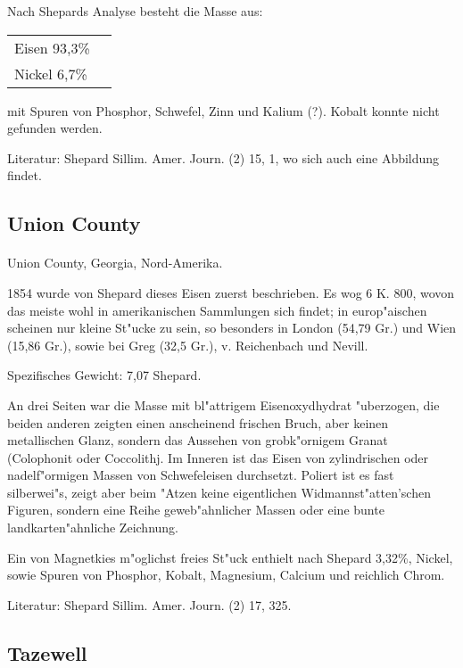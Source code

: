 \documentclass[a4paper, 11pt, oneside]{article}
\begin{document}
Nach Shepards Analyse besteht die Masse aus:
\begin{table}[H]
    \centering
    \begin{tabular}{l l}
        Eisen 93,3\% \\
        Nickel 6,7\% \\
    \end{tabular}
\end{table}

mit Spuren von Phosphor, Schwefel, Zinn und Kalium (?). Kobalt konnte nicht gefunden werden.

\footnotesize
Literatur: Shepard Sillim. Amer. Journ. (2) 15, 1, wo sich auch eine Abbildung findet.

\subsection{Union County}
\normalsize
\paragraph{}
Union County, Georgia, Nord-Amerika.

1854 wurde von Shepard dieses Eisen zuerst beschrieben. Es wog 6 K. 800, wovon das meiste wohl in amerikanischen Sammlungen sich findet; in europ"aischen scheinen nur kleine St"ucke zu sein, so besonders in London (54,79 Gr.) und Wien (15,86 Gr.), sowie bei Greg (32,5 Gr.), v. Reichenbach und Nevill.

Spezifisches Gewicht: 7,07 Shepard.

An drei Seiten war die Masse mit bl"attrigem Eisenoxydhydrat "uberzogen, die beiden anderen zeigten einen anscheinend frischen Bruch, aber keinen metallischen Glanz, sondern das Aussehen von grobk"ornigem Granat (Colophonit oder Coccolithj. Im Inneren ist das Eisen von zylindrischen oder nadelf"ormigen Massen von Schwefeleisen durchsetzt. Poliert ist es fast silberwei"s, zeigt aber beim "Atzen keine eigentlichen Widmannst"atten'schen Figuren, sondern eine Reihe geweb"ahnlicher Massen oder eine bunte landkarten"ahnliche Zeichnung.

Ein von Magnetkies m"oglichst freies St"uck enthielt nach Shepard 3,32\%, Nickel, sowie Spuren von Phosphor, Kobalt, Magnesium, Calcium und reichlich Chrom.

\footnotesize
Literatur: Shepard Sillim. Amer. Journ. (2) 17, 325.

\subsection{Tazewell}
\normalsize
\end{document}
